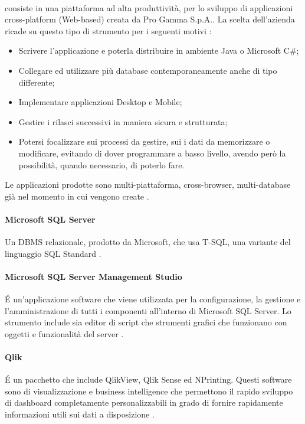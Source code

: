 \paragraph{\inde} consiste in una piattaforma ad alta produttività, per lo sviluppo di applicazioni cross-platform (Web-based) creata da Pro Gamma S.p.A.. La scelta dell'azienda ricade su questo tipo di strumento per i seguenti motivi \cite{[1]}:
\begin{itemize}
	\item Scrivere l'applicazione e poterla distribuire in ambiente Java o Microsoft C\#;
	\item Collegare ed utilizzare più database contemporaneamente anche di tipo differente;
	\item Implementare applicazioni Desktop e Mobile;
	\item Gestire i rilasci successivi in maniera sicura e strutturata;
	\item Potersi focalizzare sui processi da gestire, sui i dati da memorizzare o modificare, evitando di dover programmare a basso livello, avendo però la possibilità, quando necessario, di poterlo fare.
\end{itemize}
Le applicazioni prodotte sono multi-piattaforma, cross-browser, multi-database già nel momento in cui vengono create \cite{[1]}.

\paragraph{Microsoft SQL Server} Un DBMS relazionale, prodotto da Microsoft, che usa T-SQL, una variante del linguaggio SQL Standard \cite{[7]}. 

\paragraph{Microsoft SQL Server Management Studio} \'E un'applicazione software che viene utilizzata per la configurazione, la gestione e l'amministrazione di tutti i componenti all'interno di Microsoft SQL Server. Lo strumento include sia editor di script che strumenti grafici che funzionano con oggetti e funzionalità del server \cite{[8]}.

\paragraph{Qlik}\'E un pacchetto che include QlikView, Qlik Sense ed NPrinting. Questi software sono di visualizzazione e business intelligence che permettono il rapido sviluppo di dashboard completamente personalizzabili in grado di fornire rapidamente informazioni utili sui dati a disposizione \cite{[9]}.

